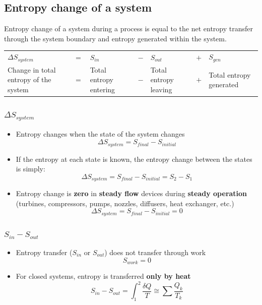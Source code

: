 \documentclass[11pt]{article}
\begin{document}
\subsection{Entropy change of a system}
\label{sec:orgc7d5e7d}
Entropy change of a system during a process is equal to the net entropy transfer through the system boundary and entropy generated within the system.
\\[0pt]

\begin{tabular}{ >{\centering\arraybackslash}m{6em} >{\centering\arraybackslash}m{1em} >{\centering\arraybackslash}m{6em} >{\centering\arraybackslash}m{1em} >{\centering\arraybackslash}m{6em} >{\centering\arraybackslash}m{1em} >{\centering\arraybackslash}m{6em} }
\(\Delta S_{system}\) & \(=\) & \(S_{in}\) & \(-\) & \(S_{out}\) & \(+\) & \(S_{gen}\) \\
Change in total entropy of the system & \(=\) & Total entropy entering & \(-\) & Total entropy leaving & \(+\) & Total entropy generated \\
\end{tabular}

\subsubsection{\(\Delta S_{system}\)}
\label{sec:org15a3809}
\begin{itemize}
\item Entropy changes when the state of the system changes
\[\Delta S_{system} = S_{final} - S_{initial}\]
\item If the entropy at each state is known, the entropy change between the states is simply:
\[\Delta S_{system} = S_{final} - S_{initial} = S_2 - S_1\]
\item Entropy change is \textbf{zero} in \textbf{steady flow} devices during \textbf{steady operation} (turbines, compressors, pumps, nozzles, diffusers, heat exchanger, etc.)
\[\Delta S_{system} = S_{final} - S_{initial} = 0\]
\end{itemize}

\subsubsection{\(S_{in} - S_{out}\)}
\label{sec:org08eaddf}
\begin{itemize}
\item Entropy transfer (\(S_{in}\) or \(S_{out}\)) does not transfer through work
\[S_{work} = 0\]
\item For closed systems, entropy is transferred \textbf{only by heat}
\[S_{in} - S_{out} = \int_1^2 \frac{\delta Q}{T} \cong \sum \frac{Q_k}{T_k}\]
\end{itemize}
\end{document}
